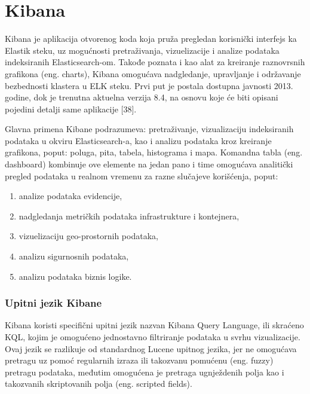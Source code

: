 \section{Kibana}
Kibana je aplikacija otvorenog koda koja pruža pregledan korisnički interfejs ka Elastik steku, uz mogućnosti pretraživanja, vizuelizacije i analize podataka indeksiranih Elasticsearch-om. Takođe poznata i kao alat za kreiranje raznovrsnih grafikona (eng. charts), Kibana omogućava nadgledanje, upravljanje i održavanje bezbednosti klastera u ELK steku. Prvi put je postala dostupna javnosti 2013. godine, dok je trenutna aktuelna verzija 8.4, na osnovu koje će biti opisani pojedini detalji same aplikacije [38].

\par
Glavna primena Kibane podrazumeva: pretraživanje, vizualizaciju indeksiranih podataka u okviru Elasticsearch-a, kao i analizu podataka kroz kreiranje grafikona, poput: poluga, pita, tabela, histograma i mapa. Komandna tabla (eng. dashboard) kombinuje ove elemente na jedan pano i time omogućava analitički pregled podataka u realnom vremenu za razne slučajeve korišćenja, poput:
\begin{enumerate}
    \item analize podataka evidencije, 
    \item nadgledanja metričkih podataka infrastrukture i kontejnera, 
    \item vizuelizaciju geo-prostornih podataka, 
    \item analizu sigurnosnih podataka, 
    \item analizu podataka biznis logike.
\end{enumerate}

\subsubsection{Upitni jezik Kibane}
Kibana koristi specifični upitni jezik nazvan Kibana Query Language, ili skraćeno KQL, kojim je omogućeno jednostavno filtriranje podataka u svrhu vizualizacije. Ovaj jezik se razlikuje od standardnog Lucene upitnog jezika, jer ne omogućava pretragu uz pomoć regularnih izraza ili takozvanu pomućenu (eng. fuzzy) pretragu podataka, međutim omogućena je pretraga ugnježdenih polja kao i takozvanih skriptovanih polja (eng. scripted fields).

